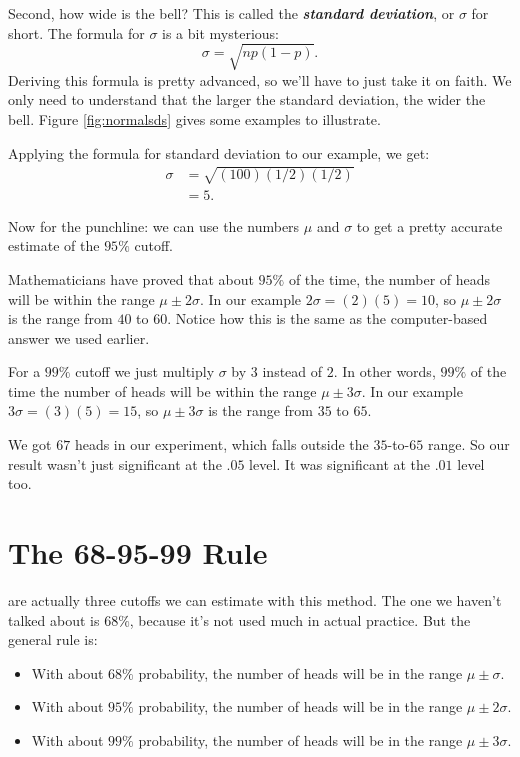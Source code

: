 \documentclass[justified]{tufte-book}
\providecommand{\tightlist}{%
  \setlength{\itemsep}{0pt}\setlength{\parskip}{0pt}}
\theoremstyle{definition}
\theoremstyle{definition}
\theoremstyle{definition}
\theoremstyle{remark}
\begin{document}
Second, how wide is the bell? This is called the \textbf{\emph{standard
deviation}}, or \(\sigma\) for short. The formula for \(\sigma\) is a
bit mysterious: \[ \sigma = \sqrt{np(1-p)}. \] Deriving this formula is
pretty advanced, so we'll have to just take it on faith. We only need to
understand that the larger the standard deviation, the wider the bell.
Figure \ref{fig:normalsds} gives some examples to illustrate.

Applying the formula for standard deviation to our example, we get: \[
  \begin{aligned}
    \sigma &= \sqrt{(100)(1/2)(1/2)}\\
           &= 5.
  \end{aligned}
\]

Now for the punchline: we can use the numbers \(\mu\) and \(\sigma\) to
get a pretty accurate estimate of the \(95\%\) cutoff.

Mathematicians have proved that about \(95\%\) of the time, the number
of heads will be within the range \(\mu \pm 2\sigma\). In our example
\(2\sigma = (2)(5) = 10\), so \(\mu \pm 2\sigma\) is the range from
\(40\) to \(60\). Notice how this is the same as the computer-based
answer we used earlier.

For a \(99\%\) cutoff we just multiply \(\sigma\) by \(3\) instead of
\(2\). In other words, \(99\%\) of the time the number of heads will be
within the range \(\mu \pm 3\sigma\). In our example
\(3\sigma = (3)(5) = 15\), so \(\mu \pm 3\sigma\) is the range from
\(35\) to \(65\).

We got \(67\) heads in our experiment, which falls outside the
\(35\)-to-\(65\) range. So our result wasn't just significant at the
\(.05\) level. It was significant at the \(.01\) level too.

\hypertarget{the-68-95-99-rule}{%
\section{The 68-95-99 Rule}\label{the-68-95-99-rule}}

 are actually three cutoffs we can estimate with this
method. The one we haven't talked about is \(68\%\), because it's not
used much in actual practice. But the general rule is:

\begin{itemize}
\tightlist
\item
  With about \(68\%\) probability, the number of heads will be in the
  range \(\mu \pm \sigma\).
\item
  With about \(95\%\) probability, the number of heads will be in the
  range \(\mu \pm 2\sigma\).
\item
  With about \(99\%\) probability, the number of heads will be in the
  range \(\mu \pm 3\sigma\).
\end{itemize}
\end{document}
